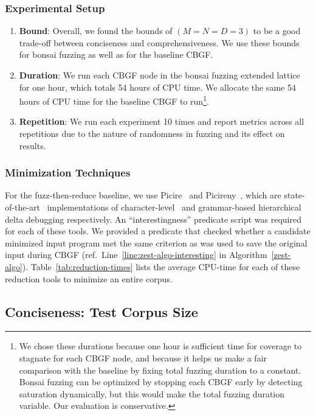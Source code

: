 \documentclass[conference]{IEEEtran}
\newcommand{\tech}{bonsai fuzzing} \newcommand{\Tech}{Bonsai fuzzing} \newcommand{\TECH}{Bonsai Fuzzing}
\begin{document}
\subsubsection*{Experimental Setup}
\begin{enumerate}
    \item \textbf{Bound}: Overall, we found the bounds of $(M = N = D = 3)$ to be a good trade-off between conciseness and comprehensiveness. We use these bounds for \tech{} as well as for the baseline CBGF.
    \item \textbf{Duration}: We run each CBGF node in the \tech{} extended lattice for one hour, which totals 54 hours of CPU time. We allocate the same 54 hours of CPU time for the baseline CBGF to run\footnote{We chose these durations because one hour is sufficient time for coverage to stagnate for each CBGF node, and because it helps us make a fair comparison with the baseline by fixing total fuzzing duration to a constant. \Tech{} can be optimized by stopping each CBGF early by detecting saturation dynamically, but this would make the total fuzzing duration variable. Our evaluation is conservative.}. 
    \item \textbf{Repetition}: We run each experiment 10 times and report metrics across all repetitions due to the nature of randomness in fuzzing and its effect on results.
\end{enumerate}

\subsubsection*{Minimization Techniques} For the fuzz-then-reduce baseline, we use Picire~\cite{Picire} and Picireny~\cite{Picireny}, which are state-of-the-art~\cite{Hodovan16-a, Hodovan16-b, Hodovan17-c, Hodovan17-d} implementations of character-level~\cite{Zeller02} and grammar-based hierarchical~\cite{Misherghi06} delta debugging respectively. An ``interestingness'' predicate script was required for each of these tools. We provided a predicate that checked whether a candidate minimized input program met the same criterion as was used to save the original input during CBGF (ref.~Line~\ref{line:zest-algo-interesting} in Algorithm~\ref{zest-algo}).
Table~\ref{tab:reduction-times} lists the average CPU-time for each of these reduction tools to minimize an entire corpus.



\subsection{Conciseness: Test Corpus Size}
\end{document}
